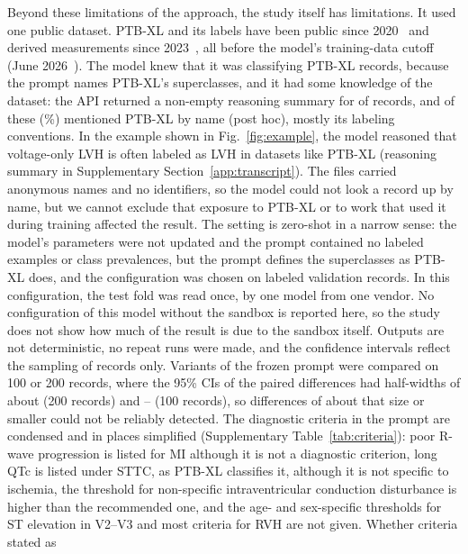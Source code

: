 Beyond these limitations of the approach, the study itself has limitations. It used one public dataset. PTB-XL and its labels have been public since
2020~\citep{Wagner2020} and derived measurements since 2023~\citep{Strodthoff2023ptbxlplus}, all before the model's
training-data cutoff (June 2026~\citep{anthropic2026models}). The model knew that it was classifying PTB-XL records,
because the prompt names PTB-XL's superclasses, and it had some knowledge of the dataset: the API returned a non-empty
reasoning summary for \PHSummariesNonEmptyN{} of \NTest{} records, and \PHThinkPTBXLN{} of these
(\PHThinkPTBXLNonEmptyPct\%) mentioned PTB-XL by name (post hoc), mostly its labeling conventions. In the example shown in Fig.~\ref{fig:example}, the model reasoned
that voltage-only LVH is often labeled as LVH in datasets like PTB-XL (reasoning summary in Supplementary
Section~\ref{app:transcript}). The
files carried anonymous names and no identifiers, so the model could not look a record up by name, but we cannot exclude
that exposure to PTB-XL or to work that used it during training affected the result. The setting is zero-shot in a
narrow sense: the model's parameters were not updated and the prompt contained no labeled examples or class
prevalences, but the prompt defines the superclasses as PTB-XL does, and the configuration was chosen on labeled
validation records. In this configuration, the test fold was read once, by one model from one vendor. No configuration of this model without the sandbox is reported
here, so the study does not show how much of the result is due to the sandbox itself. Outputs are not deterministic, no repeat runs were made, and the confidence
intervals reflect the sampling of records only. Variants of the frozen prompt were compared on 100 or 200 records, where
the 95\% CIs of the paired differences had half-widths of about \DevFreshVFiveDiffHalfWidth{} (200 records) and
\DevBothDiffHalfWidth--\DevStatementsDiffHalfWidth{} (100 records), so differences of about that size or smaller could
not be reliably detected. The diagnostic criteria in the prompt are condensed and in places simplified (Supplementary
Table~\ref{tab:criteria}): poor R-wave progression is listed for MI although it is not a diagnostic criterion, long
QTc is listed under STTC, as PTB-XL classifies it, although it is not specific to ischemia, the threshold for
non-specific intraventricular conduction disturbance is higher than the recommended one, and the age- and
sex-specific thresholds for ST elevation in V2--V3 and most criteria for RVH are not given. Whether criteria stated as
